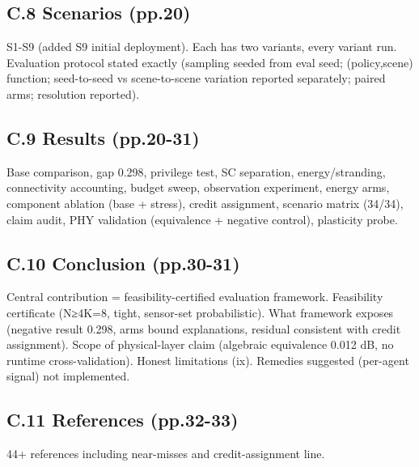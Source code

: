 \documentclass[10pt]{article}
\begin{document}
\subsection{C.8 Scenarios (pp.20)}
S1-S9 (added S9 initial deployment). Each has two variants, every variant run. Evaluation protocol stated exactly (sampling seeded from eval seed; (policy,scene) function; seed-to-seed vs scene-to-scene variation reported separately; paired arms; resolution reported).

\subsection{C.9 Results (pp.20-31)}
Base comparison, gap 0.298, privilege test, SC separation, energy/stranding, connectivity accounting, budget sweep, observation experiment, energy arms, component ablation (base + stress), credit assignment, scenario matrix (34/34), claim audit, PHY validation (equivalence + negative control), plasticity probe.

\subsection{C.10 Conclusion (pp.30-31)}
Central contribution = feasibility-certified evaluation framework. Feasibility certificate (N≥4K=8, tight, sensor-set probabilistic). What framework exposes (negative result 0.298, arms bound explanations, residual consistent with credit assignment). Scope of physical-layer claim (algebraic equivalence 0.012 dB, no runtime cross-validation). Honest limitations (ix). Remedies suggested (per-agent signal) not implemented.

\subsection{C.11 References (pp.32-33)}
44+ references including near-misses and credit-assignment line.

\end{document}
